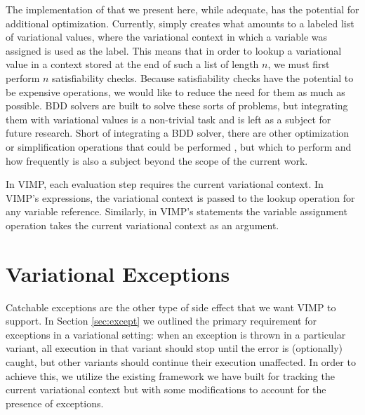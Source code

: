 \documentclass[12pt,oneside]{book}
\begin{document}
The implementation of  that we present here, while adequate, has the potential for additional optimization. Currently,  simply creates what amounts to a labeled list of variational values, where the variational context in which a variable was assigned is used as the label.
This means that in order to lookup a variational value in a context stored at the end of such a list of length $n$, we must first perform $n$ satisfiability checks.
Because satisfiability checks have the potential to be expensive operations, we would like to reduce the need for them as much as possible.
BDD solvers are built to solve these sorts of problems, but integrating them with variational values is a non-trivial task and is left as a subject for future research.
Short of integrating a BDD solver, there are other optimization or simplification operations that could be performed \cite{Walk13thesis,HW16fosd}, but which to perform and how frequently
is also a subject beyond the scope of the current work.

In VIMP, each evaluation step requires the current variational context. In VIMP's expressions, the variational context is passed to the lookup operation for any
variable reference. Similarly, in VIMP's statements the variable assignment operation takes the current variational context as an argument.

\section{Variational Exceptions}
\label{sec:varexcept}

Catchable exceptions are the other type of side effect that we want VIMP to support. In Section \ref{sec:except} we outlined the primary requirement for exceptions
in a variational setting: when an exception is thrown in a particular variant, all execution in that variant should stop until the error is (optionally) caught, but other variants
should continue their execution unaffected. In order to achieve this, we utilize the existing framework we have built for tracking the current variational context but with some
modifications to account for the presence of exceptions.
\end{document}
